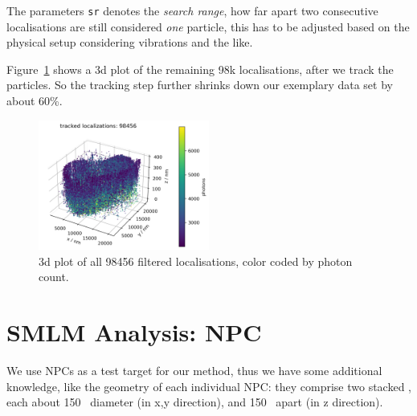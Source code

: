 \documentclass[11pt, a4paper, oneside, twocolumn]{report}
\renewcommand{\tt}{\texttt}
\renewcommand{\t}{\todo}
\newcommand{\e}{\emph}
\newcommand{\n}{\textnormal}
\newcommand{\m}{\mathrm}
\begin{document}
The parameters \tt{sr} denotes the \e{search range}, how far apart two
consecutive localisations are still considered \e{one} particle, this
has to be adjusted based on the physical setup considering vibrations
and the like.

Figure~\ref{f:5_tracking} shows a 3d plot of the remaining 98k
localisations, after we track the particles. So the tracking step
further shrinks down our exemplary data set by about 60\%.

  
  

\begin{figure}[h!]
  \centering
  \includegraphics[width=0.5\textwidth]{5_tracking.png}
  \caption{3d plot of all 98456 filtered localisations, color coded by
    photon count.}
  \label{f:5_tracking}
\end{figure}


\section{SMLM Analysis: NPC}\label{s:r:ananpc}

We use NPCs as a test target for our method, thus we have some
additional knowledge, like the geometry of each individual NPC: they
comprise two stacked \t{tori}, each about \SI{150}{\n\m} diameter (in
x,y direction), and \SI{150}{\n\m} apart (in z direction).
\end{document}

